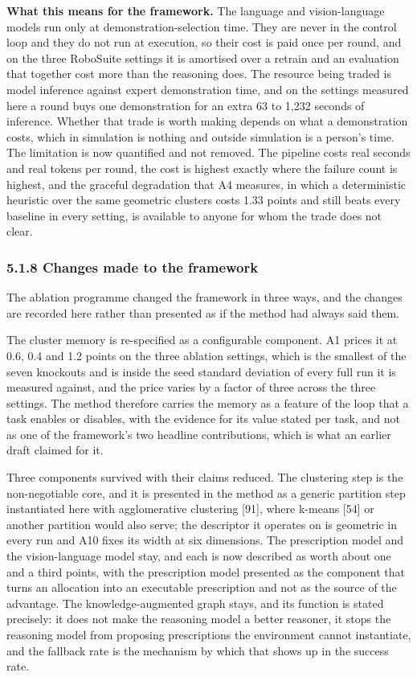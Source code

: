 \documentclass[
  11pt,
]{article}
\begin{document}
\textbf{What this means for the framework.} The language and
vision-language models run only at demonstration-selection time. They
are never in the control loop and they do not run at execution, so their
cost is paid once per round, and on the three RoboSuite settings it is
amortised over a retrain and an evaluation that together cost more than
the reasoning does. The resource being traded is model inference against
expert demonstration time, and on the settings measured here a round
buys one demonstration for an extra 63 to 1,232 seconds of inference.
Whether that trade is worth making depends on what a demonstration
costs, which in simulation is nothing and outside simulation is a
person's time. The limitation is now quantified and not removed. The
pipeline costs real seconds and real tokens per round, the cost is
highest exactly where the failure count is highest, and the graceful
degradation that A4 measures, in which a deterministic heuristic over
the same geometric clusters costs 1.33 points and still beats every
baseline in every setting, is available to anyone for whom the trade
does not clear.

\hypertarget{changes-made-to-the-framework}{%
\subsubsection{5.1.8 Changes made to the
framework}\label{changes-made-to-the-framework}}

The ablation programme changed the framework in three ways, and the
changes are recorded here rather than presented as if the method had
always said them.

The cluster memory is re-specified as a configurable component. A1
prices it at 0.6, 0.4 and 1.2 points on the three ablation settings,
which is the smallest of the seven knockouts and is inside the seed
standard deviation of every full run it is measured against, and the
price varies by a factor of three across the three settings. The method
therefore carries the memory as a feature of the loop that a task
enables or disables, with the evidence for its value stated per task,
and not as one of the framework's two headline contributions, which is
what an earlier draft claimed for it.

Three components survived with their claims reduced. The clustering step
is the non-negotiable core, and it is presented in the method as a
generic partition step instantiated here with agglomerative clustering
{[}91{]}, where k-means {[}54{]} or another partition would also serve;
the descriptor it operates on is geometric in every run and A10 fixes
its width at six dimensions. The prescription model and the
vision-language model stay, and each is now described as worth about one
and a third points, with the prescription model presented as the
component that turns an allocation into an executable prescription and
not as the source of the advantage. The knowledge-augmented graph stays,
and its function is stated precisely: it does not make the reasoning
model a better reasoner, it stops the reasoning model from proposing
prescriptions the environment cannot instantiate, and the fallback rate
is the mechanism by which that shows up in the success rate.
\end{document}
